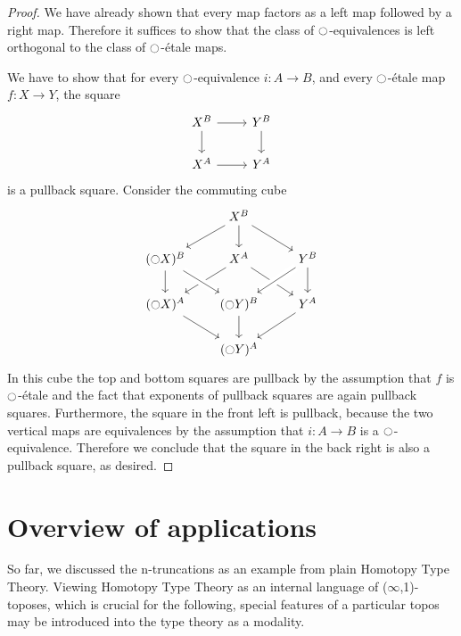 \documentclass[9pt,twosided]{amsart}
\begin{document}
\begin{proof}
  We have already shown that every map factors as a left map followed by a right map. Therefore it suffices to show that the class of ${\ocircle}$-equivalences is left orthogonal to the class of ${\ocircle}$-\'etale maps.
  
We have to show that for every ${\ocircle}$-equivalence $i:A\to B$, and every ${\ocircle}$-\'etale map $f:X\to Y$, the square
\begin{equation*}
\begin{tikzcd}
X^B \arrow[r] \arrow[d] & Y^B \arrow[d] \\
X^A \arrow[r] & Y^A
\end{tikzcd}
\end{equation*}
is a pullback square. Consider the commuting cube
\begin{equation*}
\begin{tikzcd}
&[-1ex] X^B \arrow[dl] \arrow[d] \arrow[dr] \\
(\modal X)^B \arrow[d] & X^A \arrow[dl] \arrow[dr] & Y^B \arrow[d] \arrow[dl,crossing over] \\
(\modal X)^A \arrow[dr] & (\modal Y)^B \arrow[from=ul,crossing over] \arrow[d] & Y^A \arrow[dl] \\
& (\modal Y)^A
\end{tikzcd}
\end{equation*}
In this cube the top and bottom squares are pullback by the assumption that $f$ is ${\ocircle}$-\'etale and the fact that exponents of pullback squares are again pullback squares. Furthermore, the square in the front left is pullback, because the two vertical maps are equivalences by the assumption that $i:A\to B$ is a ${\ocircle}$-equivalence. Therefore we conclude that the square in the back right is also a pullback square, as desired.
\end{proof}

\section{Overview of applications}

So far, we discussed the n-truncations as an example from plain Homotopy Type Theory.
Viewing Homotopy Type Theory as an internal language of ($\infty$,1)-toposes, 
which is crucial for the following,
special features of a particular topos may be introduced into the type theory as a modality.
\end{document}
